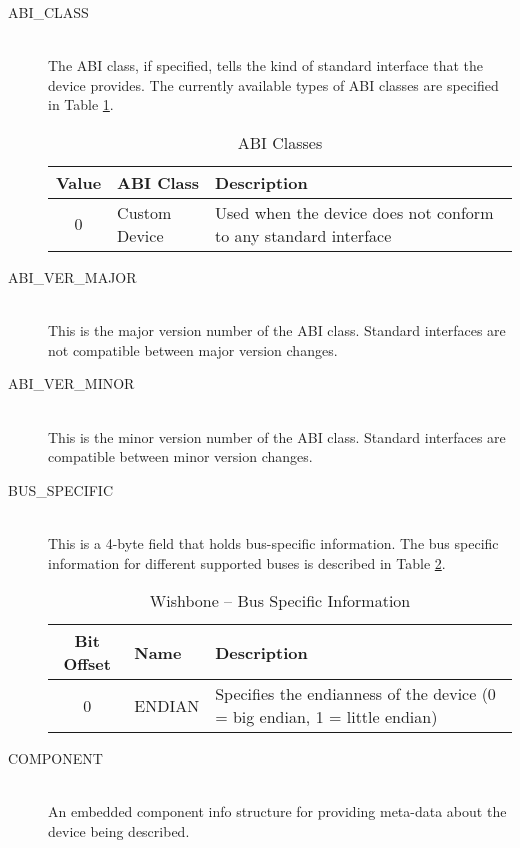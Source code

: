 \documentclass[a4paper, 12pt]{article}
\begin{document}
\begin{description}
\item[ABI\_CLASS] \hfill \\
The ABI class, if specified, tells the kind of standard interface that the device provides. The
currently available types of ABI classes are specified in Table \ref{abi_class_list}.

\begin{center}
  \begin{savenotes}
    \begin{table}[!ht]\footnotesize
      \caption{ABI Classes}\label{abi_class_list}\centering
        \begin{tabular}{| c | l | p{5cm} |} \hline
        Value & ABI Class & Description \\ \hline
        0 & Custom Device & Used when the device does not conform to any standard interface \\ \hline
        \end{tabular}
    \end{table}
  \end{savenotes}
\end{center}

\item[ABI\_VER\_MAJOR] \hfill \\
This is the major version number of the ABI class. Standard interfaces are not compatible between
major version changes.

\item[ABI\_VER\_MINOR] \hfill \\
This is the minor version number of the ABI class. Standard interfaces are compatible between
minor version changes.

\item[BUS\_SPECIFIC] \hfill \\
This is a 4-byte field that holds bus-specific information. The bus specific information for different
supported buses is described in Table \ref{bus_specific}.

\begin{center}
  \begin{savenotes}
    \begin{table}[!ht]\footnotesize
      \caption{Wishbone -- Bus Specific Information}\label{bus_specific}\centering
        \begin{tabular}{| c | l | p{5cm} |} \hline
        Bit Offset & Name & Description \\ \hline
        0 & ENDIAN & Specifies the endianness of the device (0 = big endian, 1 = little endian) \\ \hline
        \end{tabular}
    \end{table}
  \end{savenotes}
\end{center}

\item[COMPONENT] \hfill \\
An embedded component info structure for providing meta-data about the device being described.
\end{description}
\end{document}
